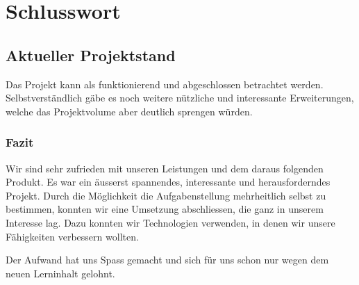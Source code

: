 
\chapter{Schlusswort}
\label{chap:Schlusswort}
\section{Aktueller Projektstand}
Das Projekt kann als funktionierend und abgeschlossen betrachtet werden. Selbstverständlich gäbe es noch weitere nützliche und interessante Erweiterungen, welche das Projektvolume aber deutlich sprengen würden.

\subsection{Fazit}
Wir sind sehr zufrieden mit unseren Leistungen und dem daraus folgenden Produkt. Es war ein äusserst spannendes, interessante und herausforderndes Projekt. Durch die Möglichkeit die Aufgabenstellung mehrheitlich selbst zu bestimmen, konnten wir eine Umsetzung abschliessen, die ganz in unserem Interesse lag. Dazu konnten wir Technologien verwenden, in denen wir unsere Fähigkeiten verbessern wollten.

Der Aufwand hat uns Spass gemacht und sich für uns schon nur wegen dem neuen Lerninhalt gelohnt.








